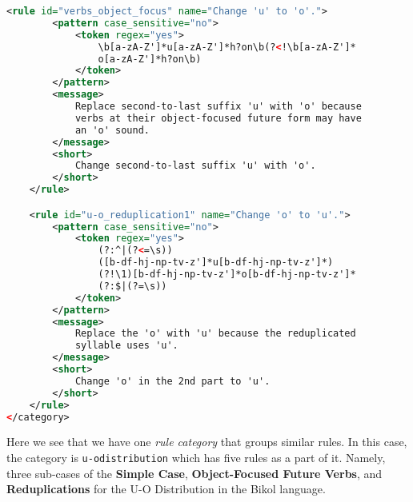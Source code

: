 \begin{lstlisting}[language= XML, caption=Grammar for U-O Distribution]
    <rule id="verbs_object_focus" name="Change 'u' to 'o'.">
        <pattern case_sensitive="no"> 
            <token regex="yes">
                \b[a-zA-Z']*u[a-zA-Z']*h?on\b(?<!\b[a-zA-Z']*
                o[a-zA-Z']*h?on\b)
            </token>
        </pattern>
        <message>
            Replace second-to-last suffix 'u' with 'o' because 
            verbs at their object-focused future form may have 
            an 'o' sound. 
        </message>
        <short>
            Change second-to-last suffix 'u' with 'o'.
        </short>
    </rule>

    <rule id="u-o_reduplication1" name="Change 'o' to 'u'.">
        <pattern case_sensitive="no"> 
            <token regex="yes">
                (?:^|(?<=\s))
                ([b-df-hj-np-tv-z']*u[b-df-hj-np-tv-z']*)
                (?!\1)[b-df-hj-np-tv-z']*o[b-df-hj-np-tv-z']*
                (?:$|(?=\s))
            </token>
        </pattern>
        <message>
            Replace the 'o' with 'u' because the reduplicated 
            syllable uses 'u'. 
        </message>
        <short>
            Change 'o' in the 2nd part to 'u'.
        </short>
    </rule>
</category>
\end{lstlisting}

Here we see that we have one \textit{rule category} that groups similar rules. In this case, the category is \texttt{u-o\textunderscore distribution} which has five rules as a part of it. Namely, three sub-cases of the \textbf{Simple Case}, \textbf{Object-Focused Future Verbs}, and \textbf{Reduplications} for the U-O Distribution in the Bikol language.

